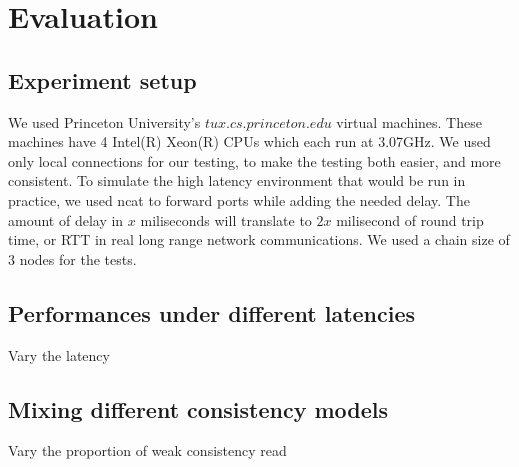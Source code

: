 \section{Evaluation}
\label{sec:eval}

\subsection{Experiment setup}
We used Princeton University's $tux.cs.princeton.edu$ virtual machines.
These machines have 4 Intel(R) Xeon(R) CPUs which each run at 3.07GHz.
We used only local connections for our testing, to make the testing both easier, and more consistent.
To simulate the high latency environment that would be run in practice,
we used ncat to forward ports while adding the needed delay. The amount of delay in $x$ miliseconds will
translate to $2x$ milisecond of round trip time, or RTT in real long range network communications.
We used a chain size of 3 nodes for the tests.


\subsection{Performances under different latencies}
Vary the latency


\subsection{Mixing different consistency models}
Vary the proportion of weak consistency read




